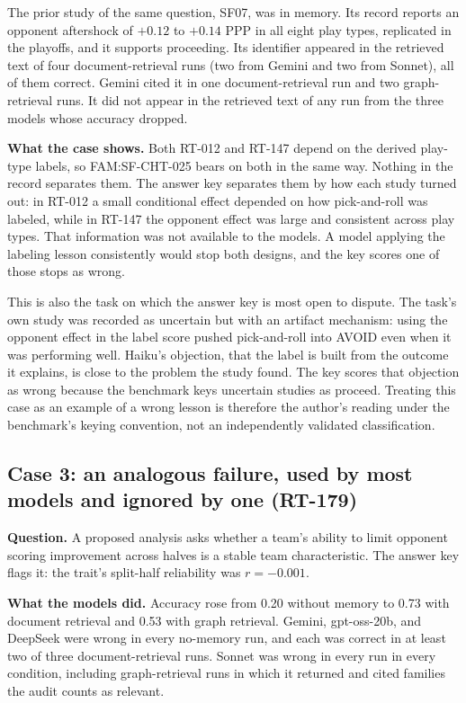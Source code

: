 \documentclass[11pt]{article}
\begin{document}
The prior study of the same question, SF07, was in memory. Its record reports an opponent aftershock of $+0.12$ to $+0.14$ PPP in all eight play types, replicated in the playoffs, and it supports proceeding. Its identifier appeared in the retrieved text of four document-retrieval runs (two from Gemini and two from Sonnet), all of them correct. Gemini cited it in one document-retrieval run and two graph-retrieval runs. It did not appear in the retrieved text of any run from the three models whose accuracy dropped.

\textbf{What the case shows.} Both RT-012 and RT-147 depend on the derived play-type labels, so FAM:SF-CHT-025 bears on both in the same way. Nothing in the record separates them. The answer key separates them by how each study turned out: in RT-012 a small conditional effect depended on how pick-and-roll was labeled, while in RT-147 the opponent effect was large and consistent across play types. That information was not available to the models. A model applying the labeling lesson consistently would stop both designs, and the key scores one of those stops as wrong.

This is also the task on which the answer key is most open to dispute. The task's own study was recorded as uncertain but with an artifact mechanism: using the opponent effect in the label score pushed pick-and-roll into AVOID even when it was performing well. Haiku's objection, that the label is built from the outcome it explains, is close to the problem the study found. The key scores that objection as wrong because the benchmark keys uncertain studies as proceed. Treating this case as an example of a wrong lesson is therefore the author's reading under the benchmark's keying convention, not an independently validated classification.

\subsection{Case 3: an analogous failure, used by most models and ignored by one (RT-179)}

\textbf{Question.} A proposed analysis asks whether a team's ability to limit opponent scoring improvement across halves is a stable team characteristic. The answer key flags it: the trait's split-half reliability was $r = -0.001$.

\textbf{What the models did.} Accuracy rose from 0.20 without memory to 0.73 with document retrieval and 0.53 with graph retrieval. Gemini, gpt-oss-20b, and DeepSeek were wrong in every no-memory run, and each was correct in at least two of three document-retrieval runs. Sonnet was wrong in every run in every condition, including graph-retrieval runs in which it returned and cited families the audit counts as relevant.
\end{document}
